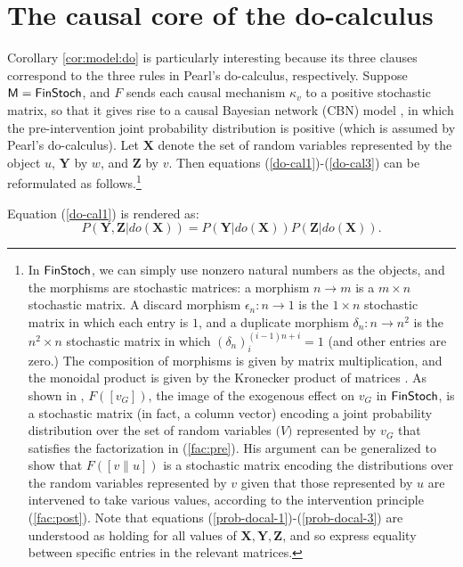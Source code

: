 \documentclass[12pt]{amsart}
\theoremstyle{plain}
\theoremstyle{definition}
\theoremstyle{remark}
\numberwithin{equation}{section}
\theoremstyle{plain}
\newcommand{\0}{\emptyset}
\newcommand{\fun}{\longrightarrow}
\newcommand{\cat}[1]{\textup{\textsf{#1}}}
\begin{document}
\section{The causal core of the do-calculus}
\label{sec:cal}
Corollary \ref{cor:model:do} is particularly interesting because its three clauses correspond to the three rules in Pearl's do-calculus, respectively. Suppose $\cat M = \cat{FinStoch}$, and $F$ sends each causal mechanism $\kappa_v$ to a positive stochastic matrix, so that it gives rise to a causal Bayesian network (CBN) model \cite{Fong:thesis}, in which the pre-intervention joint probability distribution is positive (which is assumed by Pearl's do-calculus). Let $\mathbf{X}$ denote the set of random variables represented by the object $u$, $\mathbf{Y}$ by $w$, and $\mathbf{Z}$ by $v$. Then equations (\ref{do-cal1})-(\ref{do-cal3}) can be reformulated as follows.\footnote{In $\cat{FinStoch}$, we can simply use nonzero natural numbers as the objects, and the morphisms are stochastic matrices: a morphism $n\fun m$ is a $m\times n$ stochastic matrix. A discard morphism $\epsilon_n: n\fun 1$ is the $1\times n$ stochastic matrix in which each entry is $1$, and a duplicate morphism $\delta_n : n \fun n^2$ is the $n^2\times n$ stochastic matrix in which $(\delta_n)^{(i - 1)n + i}_{i} = 1$ (and other entries are zero.) The composition of morphisms is given by matrix multiplication, and the monoidal product is given by the Kronecker product of matrices \cite{Fong:thesis,fritz2020synthetic}. As shown in \cite{Fong:thesis}, $F([v_G])$, the image of the exogenous effect on $v_G$ in $\cat{FinStoch}$, is a stochastic matrix (in fact, a column vector) encoding a joint probability distribution over the set of random variables $\mathbf(V)$ represented by $v_G$ that satisfies the factorization in (\ref{fac:pre}). His argument can be generalized to show that $F([v\|u])$ is a stochastic matrix encoding the distributions over the random variables represented by $v$ given that those represented by $u$ are intervened to take various values, according to the intervention principle (\ref{fac:post}). Note that equations (\ref{prob-docal-1})-(\ref{prob-docal-3}) are understood as holding for all values of $\mathbf{X}, \mathbf{Y}, \mathbf{Z}$, and so express equality between specific entries in the relevant matrices.}

Equation (\ref{do-cal1}) is rendered as:
\begin{equation}
\label{prob-docal-1}
P(\mathbf{Y}, \mathbf{Z} | do(\mathbf{X})) = P(\mathbf{Y} | do(\mathbf{X}))P(\mathbf{Z} | do(\mathbf{X})).
\end{equation}
\end{document}
